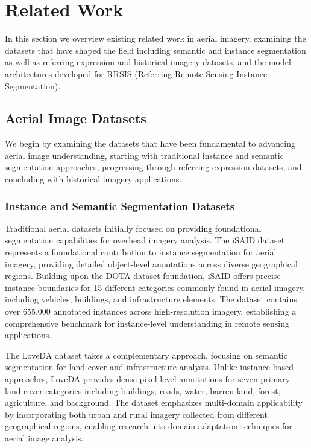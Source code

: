 
\section{Related Work}
\label{sec:related}

In this section we overview existing related work in aerial imagery, examining the datasets that have shaped the field including semantic and instance segmentation as well as referring expression and historical imagery datasets, and the model architectures developed for RRSIS (Referring Remote Sensing Instance Segmentation).

\subsection{Aerial Image Datasets}

We begin by examining the datasets that have been fundamental to advancing aerial image understanding, starting with traditional instance and semantic segmentation approaches, progressing through referring expression datasets, and concluding with historical imagery applications.

\subsubsection{Instance and Semantic Segmentation Datasets}

Traditional aerial datasets initially focused on providing foundational segmentation capabilities for overhead imagery analysis. The iSAID dataset represents a foundational contribution to instance segmentation for aerial imagery, providing detailed object-level annotations across diverse geographical regions. Building upon the DOTA dataset foundation, iSAID offers precise instance boundaries for 15 different categories commonly found in aerial imagery, including vehicles, buildings, and infrastructure elements. The dataset contains over 655,000 annotated instances across high-resolution imagery, establishing a comprehensive benchmark for instance-level understanding in remote sensing applications.

The LoveDA dataset takes a complementary approach, focusing on semantic segmentation for land cover and infrastructure analysis. Unlike instance-based approaches, LoveDA provides dense pixel-level annotations for seven primary land cover categories including buildings, roads, water, barren land, forest, agriculture, and background. The dataset emphasizes multi-domain applicability by incorporating both urban and rural imagery collected from different geographical regions, enabling research into domain adaptation techniques for aerial image analysis.

